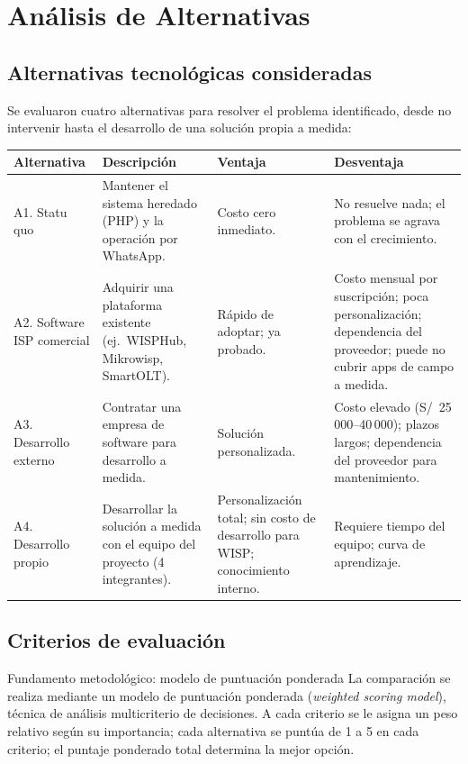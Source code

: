 \section{Análisis de Alternativas}
\label{sec:alternativas}

\subsection{Alternativas tecnológicas consideradas}

Se evaluaron cuatro alternativas para resolver el problema identificado, desde no
intervenir hasta el desarrollo de una solución propia a medida:

\begin{center}
\label{tab:alternativas}
\begin{tabularx}{\textwidth}{L{2.2cm} X X X}
\toprule
\textbf{Alternativa} & \textbf{Descripción} & \textbf{Ventaja} & \textbf{Desventaja} \\
\midrule
A1. Statu quo &
Mantener el sistema heredado (PHP) y la operación por WhatsApp. &
Costo cero inmediato. &
No resuelve nada; el problema se agrava con el crecimiento. \\
A2. Software ISP comercial &
Adquirir una plataforma existente (ej.\ WISPHub, Mikrowisp, SmartOLT). &
Rápido de adoptar; ya probado. &
Costo mensual por suscripción; poca personalización; dependencia del proveedor;
puede no cubrir apps de campo a medida. \\
A3. Desarrollo externo &
Contratar una empresa de software para desarrollo a medida. &
Solución personalizada. &
Costo elevado (S/~25\,000--40\,000); plazos largos; dependencia del proveedor para
mantenimiento. \\
A4. Desarrollo propio &
Desarrollar la solución a medida con el equipo del proyecto (4 integrantes). &
Personalización total; sin costo de desarrollo para WISP; conocimiento interno. &
Requiere tiempo del equipo; curva de aprendizaje. \\
\bottomrule
\end{tabularx}
\end{center}

\subsection{Criterios de evaluación}

\begin{upeubox}{Fundamento metodológico: modelo de puntuación ponderada}
La comparación se realiza mediante un modelo de puntuación ponderada
(\textit{weighted scoring model}), técnica de análisis multicriterio de decisiones.
A cada criterio se le asigna un peso relativo según su importancia; cada alternativa
se puntúa de 1 a 5 en cada criterio; el puntaje ponderado total determina la mejor
opción.
\end{upeubox}

